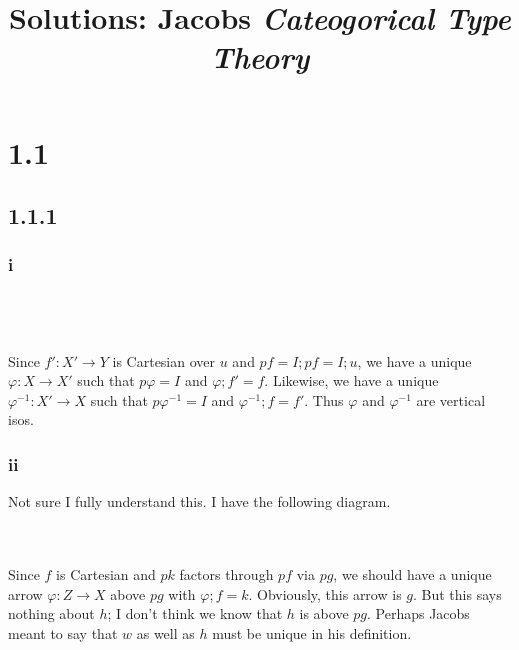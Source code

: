 \documentclass{article}
\title{Solutions: Jacobs \emph{Cateogorical Type Theory} }
\begin{document}
\maketitle

\section*{1.1}

\subsection*{1.1.1}

\subsubsection*{i}
\\~\\~\\
Since $f' : X' \to Y$ is Cartesian over $u$ and $pf = I;pf = I;u$, we have a
unique $\varphi : X \to X'$ such that $p \varphi = I$ and $\varphi;f' = f$.
Likewise, we have a unique $\varphi^{-1} : X' \to X$ such that $p \varphi^{-1} = I$ 
and $\varphi^{-1};f = f'$. Thus $\varphi$ and $\varphi^{-1}$ are vertical isos.

\subsubsection*{ii} 

Not sure I fully understand this. I have the following diagram.

\\~\\
Since $f$ is Cartesian and $pk$ factors through $pf$ via $pg$, we should have a unique arrow $\varphi : Z \to X$ above
$pg$ with $\varphi;f = k$. Obviously, this arrow is $g$. But this says nothing about $h$; I don't think we know that
$h$ is above $pg$. Perhaps Jacobs meant to say that $w$ as well as $h$ must be unique in his definition. 
\end{document}
